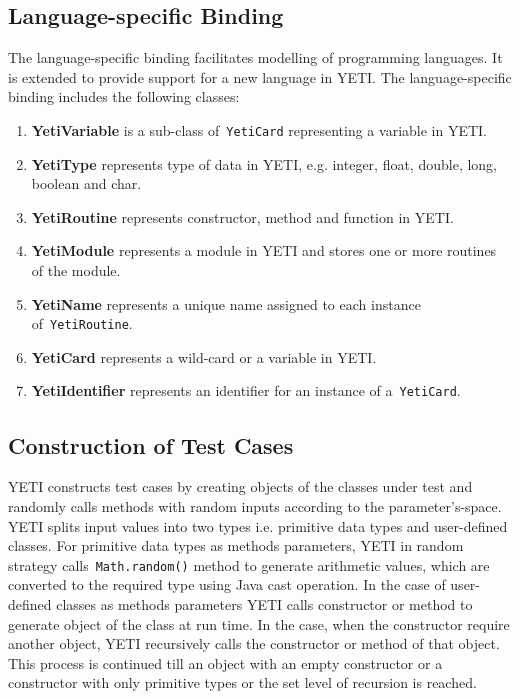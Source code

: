 \subsection{Language-specific Binding}
The language-specific binding facilitates modelling of programming languages. It is extended to provide support for a new language in YETI. The language-specific binding includes the following classes:
\begin{enumerate}
\item {\textbf{YetiVariable}} is a sub-class of~\verb+YetiCard+ representing a variable in YETI.
\item {\textbf{YetiType}} represents type of data in YETI, e.g. integer, float, double, long, boolean and char.
\item {\textbf{YetiRoutine}} represents constructor, method and function in YETI. 
\item {\textbf{YetiModule}} represents a module in YETI and stores one or more routines of the module.
\item {\textbf{YetiName}} represents a unique name assigned to each instance of~\verb+YetiRoutine+.
\item {\textbf{YetiCard}} represents a wild-card or a variable in YETI.
\item {\textbf{YetiIdentifier}} represents an identifier for an instance of a~\verb+YetiCard+.
\end{enumerate}

\subsection{Construction of Test Cases} \label{sec:constructionOfTestCases}
YETI constructs test cases by creating objects of the classes under test and randomly calls methods with random inputs according to the parameter's-space. YETI splits input values into two types i.e. primitive data types and user-defined classes. For primitive data types as methods parameters, YETI in random strategy calls~\verb+Math.random()+ method to generate arithmetic values, which are converted to the required type using Java cast operation. In the case of user-defined classes as methods parameters YETI calls constructor or method to generate object of the class at run time. In the case, when the constructor require another object, YETI recursively calls the constructor or method of that object. This process is continued till an object with an empty constructor or a constructor with only primitive types or the set level of recursion is reached.

